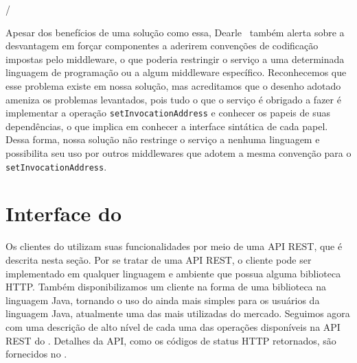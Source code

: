 /

Apesar dos benefícios de uma solução como essa, Dearle~\cite{Dearle2007PastPresentFuture} também alerta sobre a desvantagem em forçar componentes a aderirem convenções de codificação impostas pelo middleware, o que poderia restringir o serviço a uma determinada linguagem de programação ou a algum middleware específico. Reconhecemos que esse problema existe em nossa solução, mas acreditamos que o desenho adotado ameniza os problemas levantados, pois tudo o que o serviço é obrigado a fazer é implementar a operação \texttt{setInvocationAddress} e conhecer os papeis de suas dependências, o que implica em conhecer a interface sintática de cada papel. Dessa forma, nossa solução não restringe o serviço a nenhuma linguagem e possibilita seu uso por outros middlewares que adotem a mesma convenção para o \texttt{setInvocationAddress}.

\section{Interface do \ee}
\label{sec:interface}

Os clientes do \ee utilizam suas funcionalidades por meio de uma API REST, que é descrita nesta seção. 
Por se tratar de uma API REST, o cliente pode ser implementado em qualquer linguagem 
e ambiente que possua alguma biblioteca HTTP. 
Também disponibilizamos um cliente na forma de uma biblioteca na linguagem Java, 
tornando o uso do \ee ainda mais simples para os usuários da linguagem Java, 
atualmente uma das mais utilizadas do mercado. 
Seguimos agora com uma descrição de alto nível de cada uma das operações disponíveis 
na API REST do \ee. Detalhes da API, como os códigos de status HTTP retornados, 
são fornecidos no \userguide.

